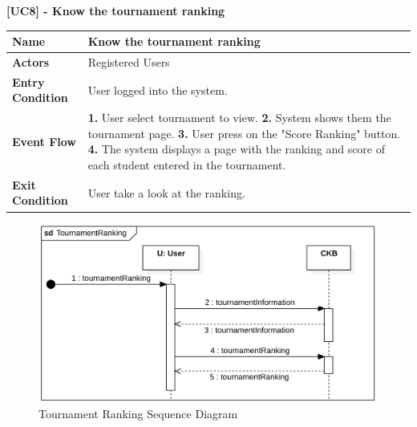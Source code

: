 \clearpage

\raggedright
\textbf{[UC8] - Know the tournament ranking}
\begin{table}[h]
\begin{tabular}{|l|p{12cm}|} \hline 

\rule[-3mm]{0mm}{1cm}
\textbf{Name} & Know the tournament ranking \\ \hline 

\rule[-3mm]{0mm}{1cm}
\textbf{Actors} & Registered Users  \\ \hline 

\rule[-3mm]{0mm}{1cm}
\textbf{Entry Condition} & User logged into the system.
\vspace{2pt}
\\ \hline 

\rule[-3mm]{0mm}{1cm}
\textbf{Event Flow} & 
\textbf{1.} User select tournament to view.
\vspace{4pt}
\newline
\textbf{2.} System shows them the tournament page.
\vspace{4pt}
\newline
\textbf{3.} User press on the "Score Ranking" button.
\vspace{4pt}
\newline
\textbf{4.} The system displays a page with the ranking and score of each student entered in the tournament.

\\ \hline 

\rule[-3mm]{0mm}{1cm}
\textbf{Exit Condition} & User take a look at the ranking. \\ \hline

\end{tabular}
\end{table}

\begin{figure}[h]
    \centering
    \includegraphics[scale=0.6]{images/SD/TournamentRankingSD.png} 
    \caption{Tournament Ranking Sequence Diagram}
    \label{fig_RankingTournamentSD}
\end{figure}

